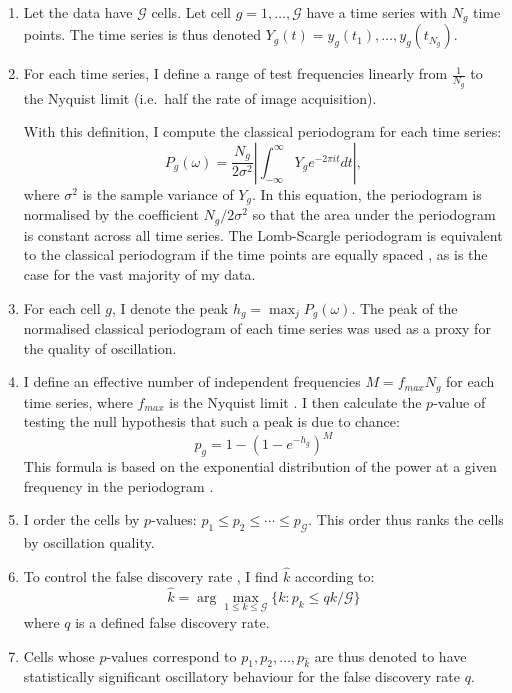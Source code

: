 \begin{enumerate}
\item Let the data have $\mathcal{G}$ cells.
Let cell $g = 1, \dots{}, \mathcal{G}$ have a time series with $N_{g}$ time points.
The time series is thus denoted $Y_{g}(t) = y_{g}(t_{1}), \dots{}, y_{g}(t_{N_{g}})$.
\item For each time series, I define a range of test frequencies linearly from $\frac{1}{N_{g}}$ to the Nyquist limit (i.e.\ half the rate of image acquisition).

With this definition, I compute the classical periodogram for each time series:
  \begin{equation}
    P_{g}(\omega) = \frac{N_{g}}{2\sigma^{2}} \left|\int_{-\infty}^{\infty} Y_{g} e^{-2\pi it}dt \right|, %
    \label{eq:normalised-periodogram-ar}
  \end{equation}
        where $\sigma^{2}$ is the sample variance of $Y_{g}$.
        In this equation, the periodogram is normalised by the coefficient $N_{g}/2\sigma^{2}$ so that the area under the periodogram is constant across all time series.
        The Lomb-Scargle periodogram is equivalent to the classical periodogram if the time points are equally spaced \parencite{lombLeastsquaresFrequencyAnalysis1976}, as is the case for the vast majority of my data.
  \item For each cell $g$, I denote the peak $h_{g} = \max_{j}P_{g}(\omega)$.
        The peak of the normalised classical periodogram of each time series was used as a proxy for the quality of oscillation.
  \item I define an effective number of independent frequencies $M = f_{max}N_{g}$ for each time series, where $f_{max}$ is the Nyquist limit \parencite{vanderplasUnderstandingLombScarglePeriodogram2018}.
  I then calculate the $p$-value of testing the null hypothesis that such a peak is due to chance:
  \begin{equation}
    p_{g} = 1 - {(1 - e^{-h_{g}})}^M
    \label{eq:lsp-pval}
  \end{equation}
  This formula is based on the exponential distribution of the power at a given frequency in the periodogram \parencite{scargleStudiesAstronomicalTime1982}.
\item I order the cells by $p$-values: $p_{1} \leq p_{2} \leq \cdots \leq p_{\mathcal{G}}$.
      This order thus ranks the cells by oscillation quality.
\item To control the false discovery rate \parencite{benjaminiControllingFalseDiscovery1995}, I find $\hat{k}$ according to:
  \begin{equation}
    \hat{k} = \arg\max_{1 \leq k \leq \mathcal{G}}\{k : p_{k} \leq qk/\mathcal{G}\}
    \label{eq:lsp-khat}
  \end{equation}
  where $q$ is a defined false discovery rate.
\item Cells whose $p$-values correspond to $p_{1}, p_{2}, \ldots, p_{\hat{k}}$ are thus denoted to have statistically significant oscillatory behaviour for the false discovery rate $q$.
\end{enumerate}


